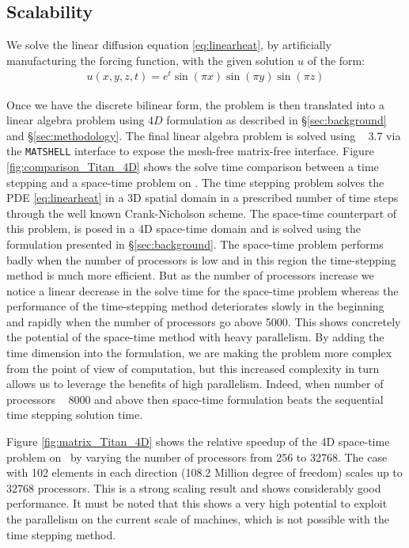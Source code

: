 \subsection{Scalability}
We solve the linear diffusion equation \ref{eq:linearheat}, by artificially manufacturing the forcing function, with the given solution $u$ of the form:
\begin{align}\label{def:manufactured-solution}
    u(x, y, z,t) =  e^{t} \sin(\pi x)\sin(\pi y)\sin(\pi z)
\end{align}

Once we have the discrete bilinear form,  the problem is then translated into a linear algebra problem using $4D$ formulation as described in  \S\ref{sec:background} and \S\ref{sec:methodology}. The final linear algebra problem is solved using \petsc~ 3.7 via the \texttt{MATSHELL} interface to expose the mesh-free matrix-free interface. Figure \ref{fig:comparison_Titan_4D} shows the solve time comparison between a time stepping and a space-time problem on \Titan. The time stepping problem solves the PDE \ref{eq:linearheat} in a 3D spatial domain in a prescribed number of time steps through the well known Crank-Nicholson scheme. The space-time counterpart of this problem, is posed in a 4D space-time domain and is solved using the formulation presented in \S\ref{sec:background}. The space-time problem performs badly when the number of processors is low and in this region the time-stepping method is much more efficient. But as the number of processors increase we notice a linear decrease in the solve time for the space-time problem whereas the performance of the time-stepping method deteriorates slowly in the beginning and rapidly when the number of processors go above 5000. This shows concretely the potential of the space-time method with heavy parallelism. By adding the time dimension into the formulation, we are making the problem more complex from the point of view of computation, but this increased complexity in turn allows us to leverage the benefits of high parallelism. Indeed, when number of processors ~ 8000 and above then space-time formulation beats the sequential time stepping solution time.

Figure \ref{fig:matrix_Titan_4D} shows the relative speedup of the 4D space-time problem on  \Titan\ by varying the number of processors from 256 to 32768. The case with 102 elements in each direction (108.2 Million degree of freedom) scales up to 32768 processors. This is a strong scaling result and shows considerably good performance. It must be noted that this %
shows a very high potential to exploit the parallelism on the current scale of machines, which is not possible with the time stepping method. %

